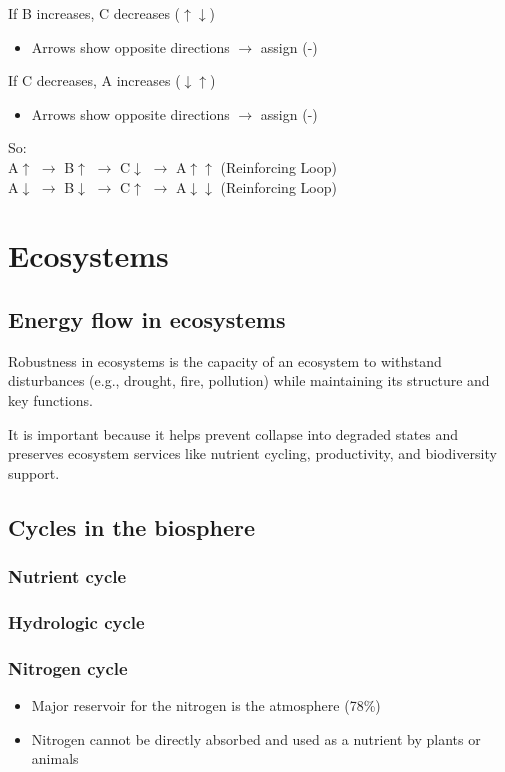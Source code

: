 \documentclass{article}
\begin{document}
If B increases, C decreases ($\uparrow\downarrow$)
\begin{itemize}
    \item Arrows show opposite directions $\rightarrow$ assign (-)
\end{itemize}

If C decreases, A increases ($\downarrow\uparrow$)
\begin{itemize}
    \item Arrows show opposite directions $\rightarrow$ assign (-)
\end{itemize}

So:\\
A$\uparrow$ $\rightarrow$ B$\uparrow$ $\rightarrow$ C$\downarrow$ $\rightarrow$ A$\uparrow\uparrow$ (Reinforcing Loop) \\
A$\downarrow$ $\rightarrow$ B$\downarrow$ $\rightarrow$ C$\uparrow$ $\rightarrow$ A$\downarrow\downarrow$ (Reinforcing Loop)

\section{Ecosystems}
\subsection{Energy flow in ecosystems}
Robustness in ecosystems is the capacity of an ecosystem to withstand disturbances (e.g., drought, fire, pollution) while maintaining its structure and key functions.

It is important because it helps prevent collapse into degraded states and preserves ecosystem services like nutrient cycling, productivity, and biodiversity support.

\subsection{Cycles in the biosphere}
\subsubsection{Nutrient cycle}
\todo

\subsubsection{Hydrologic cycle}
\todo

\subsubsection{Nitrogen cycle}
\begin{itemize}
    \item Major reservoir for the nitrogen is the atmosphere (78\%)
    \item Nitrogen cannot be directly absorbed and used as a nutrient by plants or animals
\end{itemize}
\end{document}
